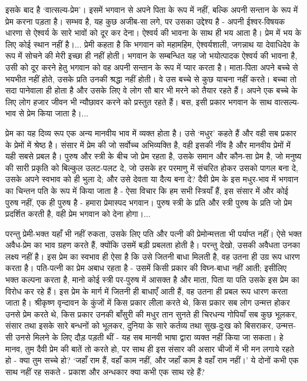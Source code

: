 इसके बाद है ‘वात्सल्य-प्रेम’। इसमें भगवान से अपने पिता के रूप में नहीं, बल्कि अपनी सन्तान के रूप में प्रेम करना पड़ता है। सम्भव है, यह कुछ अजीब-सा लगे, पर उसका उद्देश्य है - अपनी ईश्वर-विषयक धारणा से ऐश्वर्य के सारे भावों को दूर कर देना। ऐश्वर्य की भावना के साथ ही भय आता है। प्रेम में भय के लिए कोई स्थान नहीं है।... प्रेमी कहता है कि भगवान को महामहिम, ऐश्वर्यशाली, जगन्नाथ या देवाधिदेव के रूप में सोचने की मेरी इच्छा ही नहीं होती। भगवान के सम्बन्धित यह जो भयोत्पादक ऐश्वर्य की भावना है, उसी को दूर करने हेतु भगवान को वह अपनी सन्तान के रूप में प्यार करता है। माता-पिता अपने बच्चे से भयभीत नहीं होते, उसके प्रति उनकी श्रद्धा नहीं होती। वे उस बच्चे से कुछ याचना नहीं करते। बच्चा तो सदा पानेवाला ही होता है और उसके लिए वे लोग सौ बार भी मरने को तैयार रहते हैं। अपने एक बच्चे के लिए लोग हजार जीवन भी न्यौछावर करने को प्रस्तुत रहते हैं। बस, इसी प्रकार भगवान के साथ वात्सल्य-भाव से प्रेम किया जाता है।... 

प्रेम का यह दिव्य रूप एक अन्य मानवीय भाव में व्यक्त होता है। उसे ‘मधुर’ कहते हैं और वही सब प्रकार के प्रेमों में श्रेष्ठ है। संसार में प्रेम की जो सर्वोच्च अभिव्यक्ति है, वही इसकी नींव है और मानवीय प्रेमों में यही सबसे प्रबल है। पुरुष और स्त्री के बीच जो प्रेम रहता है, उसके समान और कौन-सा प्रेम है, जो मनुष्य की सारी प्रकृति को बिल्कुल उलट-पलट दे, जो उसके हर परमाणु में संचरित होकर उसको पागल बना दे, उसके अपने स्वभाव को ही भुला दे; और उसे देवता या दैत्य बना दे? दैवी प्रेम के इस मधुर-भाव में भगवान का चिन्तन पति के रूप में किया जाता है - ऐसा विचार कि हम सभी स्त्रियाँ हैं, इस संसार में और कोई पुरुष नहीं, एक ही पुरुष है - हमारा प्रेमास्पद भगवान। पुरुष स्त्री के प्रति और स्त्री पुरुष के प्रति जो प्रेम प्रदर्शित करती है, वही प्रेम भगवान को देना होगा।... 

परन्तु प्रेमी-भक्त यहाँ भी नहीं रुकता, उसके लिए पति और पत्नी की प्रेमोन्मत्तता भी पर्याप्त नहीं। ऐसे भक्त अवैध-प्रेम का भाव ग्रहण करते हैं, क्योंकि उसमें बड़ी प्रबलता होती है। परन्तु देखो, उसकी अवैधता उनका लक्ष्य नहीं है। इस प्रेम का स्वभाव ही ऐसा है कि उसे जितनी बाधा मिलती है, वह उतना ही उग्र रूप धारण करता है। पति-पत्नी का प्रेम अबाध रहता है - उसमें किसी प्रकार की विघ्न-बाधा नहीं आती; इसीलिए भक्त कल्पना करता है, मानो कोई स्त्री पर-पुरुष में आसक्त है और माता, पिता या पति उसके इस प्रेम का विरोध कर रहे हैं। इस प्रेम के मार्ग में जितनी ही बाधाएँ आती हैं, वह उतना ही प्रबल रूप धारण करता जाता है। श्रीकृष्ण वृन्दावन के कुंजों में किस प्रकार लीला करते थे, किस प्रकार सब लोग उन्मत्त होकर उनसे प्रेम करते थे, किस प्रकार उनकी बाँसुरी की मधुर तान सुनते ही चिरधन्य गोपियाँ सब कुछ भूलकर, संसार तथा इसके सारे बन्धनों को भूलकर, दुनिया के सारे कर्तव्य तथा सुख-दुःख को बिसराकर, उन्मत्त-सी उनसे मिलने के लिए दौड़ पड़ती थीं - यह सब मानवी भाषा द्वारा व्यक्त नहीं किया जा सकता। हे मानव, तुम दैवी प्रेम की बातें तो करते हो, पर साथ ही इस संसार की असार चीजों में भी मन लगाये रहते हो - क्या तुम सच्चे हो? ‘जहाँ राम हैं, वहाँ काम नहीं, और जहाँ काम है वहाँ राम नहीं।’ ये दोनों कभी एक साथ नहीं रह सकते - प्रकाश और अन्धकार क्या कभी एक साथ रहे हैं? 

